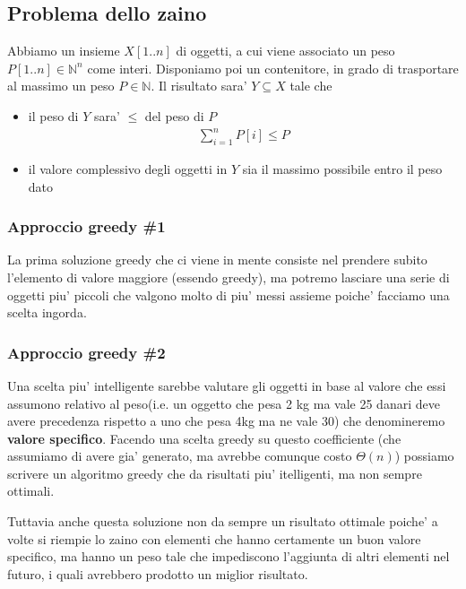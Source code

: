 \documentclass{article}
\begin{document}
\subsection{Problema dello zaino}

Abbiamo un insieme $X[1..n]$ di oggetti, a cui viene associato un peso $P[1..n]
\in \mathbb{N}^n$ come interi. Disponiamo poi un contenitore, in grado di
trasportare al massimo un peso $P \in \mathbb{N}$.
Il risultato sara' $Y \subseteq X$ tale che
\begin{itemize}
  \item il peso di $Y$ sara' $\leq$ del peso di $P$ \\
    \begin{align*}
      \sum_{i = 1}^{n} P[i] \leq P
    \end{align*}
  \item il valore complessivo degli oggetti in $Y$ sia il massimo
    possibile entro il peso dato
\end{itemize}

\subsubsection{Approccio greedy \#1}

La prima soluzione greedy che ci viene in mente consiste nel prendere subito
l'elemento di valore maggiore (essendo greedy), ma potremo lasciare una serie di
oggetti piu' piccoli che valgono molto di piu' messi assieme poiche' facciamo una
scelta ingorda.

\subsubsection{Approccio greedy \#2}

Una scelta piu' intelligente sarebbe valutare gli oggetti in base al valore
che essi assumono relativo al peso(i.e. un oggetto che pesa 2 kg ma vale 25 danari
deve avere precedenza rispetto a uno che pesa 4kg ma ne vale 30) che denomineremo
\textbf{valore specifico}. Facendo una scelta greedy su questo coefficiente
(che assumiamo di avere gia' generato, ma avrebbe comunque costo $\Theta(n)$)
possiamo scrivere un algoritmo greedy che da risultati piu' itelligenti, ma non
sempre ottimali.

Tuttavia anche questa soluzione non da sempre un risultato ottimale poiche' a volte
si riempie lo zaino con elementi che hanno certamente un buon valore specifico,
ma hanno un peso tale che impediscono l'aggiunta di altri elementi nel futuro,
i quali avrebbero prodotto un miglior risultato.
\end{document}
